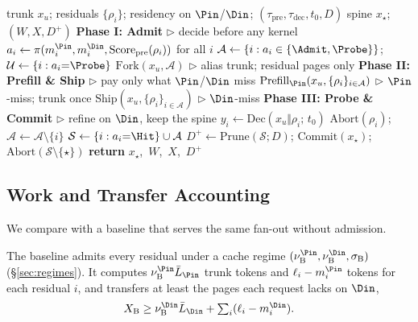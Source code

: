 \begin{algorithm}[t]
\caption{\sys{} (one fan-out).
Actions follow \eqref{eq:action}; costs follow \eqref{eq:work}--\eqref{eq:dec}.}
\label{alg:app}
\small
\begin{algorithmic}[1]
\REQUIRE trunk $x_u$; residuals $\{\rho_i\}$; residency on $\Pin$/$\Din$; $(\tau_{\mathrm{pre}},\tau_{\mathrm{dec}},t_0,D)$
\ENSURE spine $x_\star$; $(W,X,D^{+})$
\STATE
\STATE \textbf{Phase I: Admit} \hfill \(\triangleright\) decide before any kernel
\STATE $a_i\leftarrow\pi(m_i^{\Pin},m_i^{\Din},\mathrm{Score}_{\mathrm{pre}}(\rho_i))$ for all $i$
\STATE $\mathcal{A}\leftarrow\{i:a_i\in\{\Admit,\Probe\}\}$;\;
  $\mathcal{U}\leftarrow\{i:a_i{=}\Probe\}$
\STATE $\mathrm{Fork}(x_u,\mathcal{A})$ \hfill \(\triangleright\) alias trunk; residual pages only
\STATE
\STATE \textbf{Phase II: Prefill \& Ship} \hfill \(\triangleright\) pay only what $\Pin$/$\Din$ miss
\STATE $\mathrm{Prefill}_{\Pin}(x_u,\{\rho_i\}_{i\in\mathcal{A}})$ \hfill \(\triangleright\) $\Pin$-miss; trunk once
\STATE $\mathrm{Ship}(x_u,\{\rho_i\}_{i\in\mathcal{A}})$ \hfill \(\triangleright\) $\Din$-miss
\STATE
\STATE \textbf{Phase III: Probe \& Commit} \hfill \(\triangleright\) refine on $\Din$, keep the spine
  \STATE $y_i\leftarrow\mathrm{Dec}(x_u\Vert\rho_i;\,t_0)$
    \STATE $\mathrm{Abort}(\rho_i)$;\; $\mathcal{A}\leftarrow\mathcal{A}\setminus\{i\}$
  \ENDIF
\ENDFOR
\STATE $\mathcal{S}\leftarrow\{i:a_i{=}\Hit\}\cup\mathcal{A}$
\STATE $D^{+}\leftarrow\mathrm{Prune}(\mathcal{S};D)$;\;
  $\mathrm{Commit}(x_\star)$;\;
  $\mathrm{Abort}(\mathcal{S}\setminus\{\star\})$
\STATE \textbf{return} $x_\star$,\ $W$,\ $X$,\ $D^{+}$
\end{algorithmic}
\end{algorithm}

\subsection{Work and Transfer Accounting}
\label{sec:accounting}

We compare \sys with a baseline that serves the same fan-out without admission.

\begin{assumption}[Baseline]
\label{ass:baseline}
The baseline admits every residual under a cache regime $(\nu_{\mathrm{B}}^{\Pin},\nu_{\mathrm{B}}^{\Din},\sigma_{\mathrm{B}})$ (\S\ref{sec:regimes}).
It computes $\nu_{\mathrm{B}}^{\Pin}\bar L_{\Pin}$ trunk tokens and $\ell_i-m_i^{\Pin}$ tokens for each residual $i$, and transfers at least the pages each request lacks on $\Din$,
\begin{equation}
\label{eq:xbase}
X_{\mathrm{B}}\ge \nu_{\mathrm{B}}^{\Din}\bar L_{\Din}+\textstyle\sum_i(\ell_i-m_i^{\Din}).
\end{equation}
\end{assumption}

